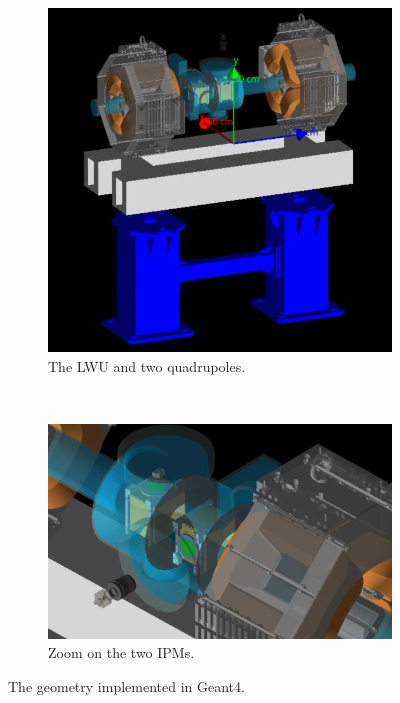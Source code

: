\begin{figure}[!ht]
	\begin{subfigure}[t]{0.385\textwidth}
		\includegraphics[width=\textwidth]{05_Conclusion/figures/fig000_geant4_sim2_a}
		\caption{The LWU and two quadrupoles.}
		\label{}
	\end{subfigure}
	~
	\begin{subfigure}[t]{0.615\textwidth}
		\includegraphics[width=\textwidth]{05_Conclusion/figures/fig000_geant4_sim2_b}
		\caption{Zoom on the two IPMs.}
		\label{}
	\end{subfigure}
	\caption[The geometry implemented in Geant4]{The geometry implemented in Geant4.}
	\label{chap5:fig:Geant4}
\end{figure}

